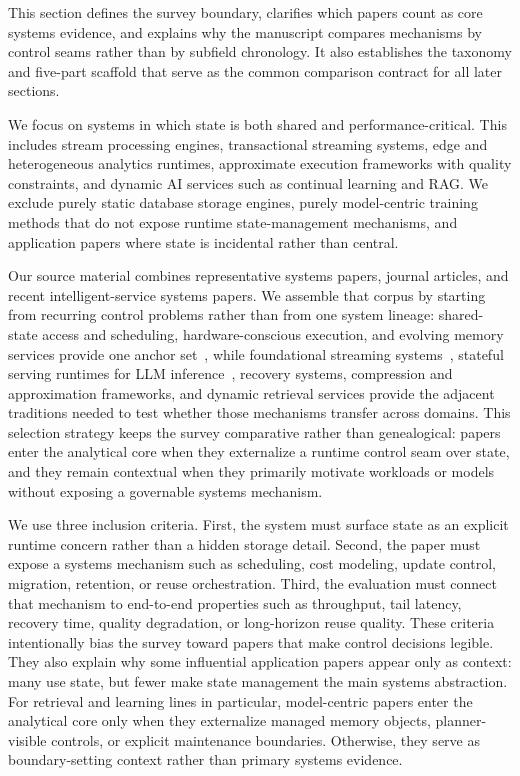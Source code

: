 \documentclass[acmsmall,screen,review]{acmart}
\begin{document}
This section defines the survey boundary, clarifies which papers count as core systems evidence, and explains why the manuscript compares mechanisms by control seams rather than by subfield chronology. It also establishes the taxonomy and five-part scaffold that serve as the common comparison contract for all later sections.

We focus on systems in which state is both shared and performance-critical. This includes stream processing engines, transactional streaming systems, edge and heterogeneous analytics runtimes, approximate execution frameworks with quality constraints, and dynamic AI services such as continual learning and RAG. We exclude purely static database storage engines, purely model-centric training methods that do not expose runtime state-management mechanisms, and application papers where state is incidental rather than central.

Our source material combines representative systems papers, journal articles, and recent intelligent-service systems papers. We assemble that corpus by starting from recurring control problems rather than from one system lineage: shared-state access and scheduling, hardware-conscious execution, and evolving memory services provide one anchor set~\cite{zhang2024survey,zhang2020hardware,mao2023morphstream,wu2023sentistream,zhang2026flowrag}, while foundational streaming systems~\cite{akidau2013millwheel,murray2013naiad,zaharia2013dstreams,akidau2015dataflow}, stateful serving runtimes for LLM inference~\cite{kwon2023pagedattention,agrawal2024sarathi,zheng2023sglang}, recovery systems, compression and approximation frameworks, and dynamic retrieval services provide the adjacent traditions needed to test whether those mechanisms transfer across domains. This selection strategy keeps the survey comparative rather than genealogical: papers enter the analytical core when they externalize a runtime control seam over state, and they remain contextual when they primarily motivate workloads or models without exposing a governable systems mechanism.

We use three inclusion criteria. First, the system must surface state as an explicit runtime concern rather than a hidden storage detail. Second, the paper must expose a systems mechanism such as scheduling, cost modeling, update control, migration, retention, or reuse orchestration. Third, the evaluation must connect that mechanism to end-to-end properties such as throughput, tail latency, recovery time, quality degradation, or long-horizon reuse quality. These criteria intentionally bias the survey toward papers that make control decisions legible. They also explain why some influential application papers appear only as context: many use state, but fewer make state management the main systems abstraction. For retrieval and learning lines in particular, model-centric papers enter the analytical core only when they externalize managed memory objects, planner-visible controls, or explicit maintenance boundaries. Otherwise, they serve as boundary-setting context rather than primary systems evidence.
\end{document}
